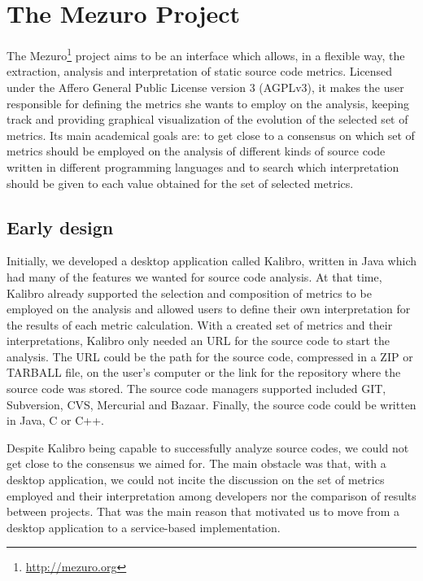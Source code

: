 \newpage
\section{The Mezuro Project}
\label{sec:mezuro}

The Mezuro\footnote{\url{http://mezuro.org}} project aims to be an interface which allows, in a flexible way, the extraction, analysis and interpretation of static source code metrics. Licensed under the Affero General Public License version 3 (AGPLv3), it makes the user responsible for defining the metrics she wants to employ on the analysis, keeping track and providing graphical visualization of the evolution of the selected set of metrics. Its main academical goals are: to get close to a consensus on which set of metrics should be employed on the analysis of different kinds of source code written in different programming languages and to search which interpretation should be given to each value obtained for the set of selected metrics.

\subsection{Early design}
\label{subsec:early-design}

Initially, we developed a desktop application called Kalibro, written in Java which had many of the features we wanted for source code analysis. At that time, Kalibro already supported the selection and composition of metrics to be employed on the analysis and allowed users to define their own interpretation for the results of each metric calculation. With a created set of metrics and their interpretations, Kalibro only needed an URL for the source code to start the analysis. The URL could be the path for the source code, compressed in a ZIP or TARBALL file, on the user's computer or the link for the repository where the source code was stored. The source code managers supported included GIT, Subversion, CVS, Mercurial and Bazaar. Finally, the source code could be written in Java, C or C++.

Despite Kalibro being capable to successfully analyze source codes, we could not get close to the consensus we aimed for. The main obstacle was that, with a desktop application, we could not incite the discussion on the set of metrics employed and their interpretation among developers nor the comparison of results between projects. That was the main reason that motivated us to move from a desktop application to a service-based implementation.

